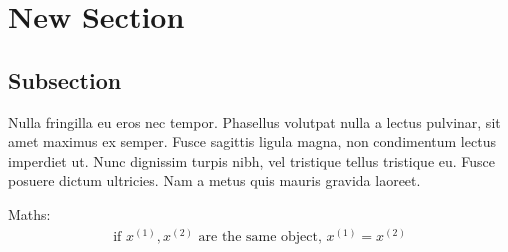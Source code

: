 \section{New Section}
\label{New Section}

\subsection{Subsection}
Nulla fringilla eu eros nec tempor. Phasellus volutpat nulla a lectus pulvinar, sit amet maximus ex semper. Fusce sagittis ligula magna, non condimentum lectus imperdiet ut. Nunc dignissim turpis nibh, vel tristique tellus tristique eu. Fusce posuere dictum ultricies. Nam a metus quis mauris gravida laoreet.
\medskip

Maths:
\begin{align*}
\text{if } x^{(1)}, x^{(2)} \text{ are the same object, } x^{(1)} = x^{(2)}
\end{align*}

